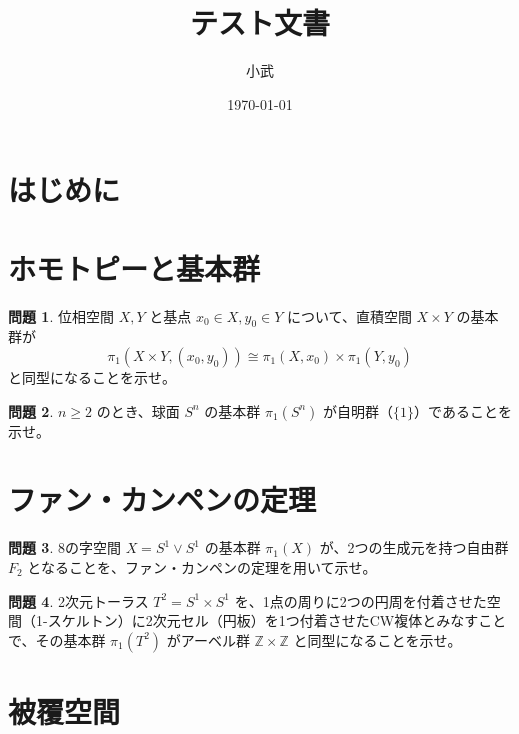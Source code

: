 \documentclass[uplatex, dvipdfmx, 11pt]{jsbook}
\numberwithin{equation}{chapter}
\theoremstyle{definition}
\newtheorem{problem}{問題}[chapter]       %
\begin{document}
\title{テスト文書}
\author{小武}
\date{\today}
\maketitle
\section{はじめに}


\maketitle
\tableofcontents
\clearpage

\section{ホモトピーと基本群}

\begin{problem}
位相空間 $X, Y$ と基点 $x_0 \in X, y_0 \in Y$ について、直積空間 $X \times Y$ の基本群が
\[
\pi_1(X \times Y, (x_0, y_0)) \cong \pi_1(X, x_0) \times \pi_1(Y, y_0)
\]
と同型になることを示せ。
\end{problem}

\begin{problem}
$n \ge 2$ のとき、球面 $S^n$ の基本群 $\pi_1(S^n)$ が自明群（$\{1\}$）であることを示せ。
\end{problem}

\section{ファン・カンペンの定理}

\begin{problem}
8の字空間 $X = S^1 \vee S^1$ の基本群 $\pi_1(X)$ が、2つの生成元を持つ自由群 $F_2$ となることを、ファン・カンペンの定理を用いて示せ。
\end{problem}

\begin{problem}
2次元トーラス $T^2 = S^1 \times S^1$ を、1点の周りに2つの円周を付着させた空間（1-スケルトン）に2次元セル（円板）を1つ付着させたCW複体とみなすことで、その基本群 $\pi_1(T^2)$ がアーベル群 $\mathbb{Z} \times \mathbb{Z}$ と同型になることを示せ。
\end{problem}

\section{被覆空間}
\end{document}
